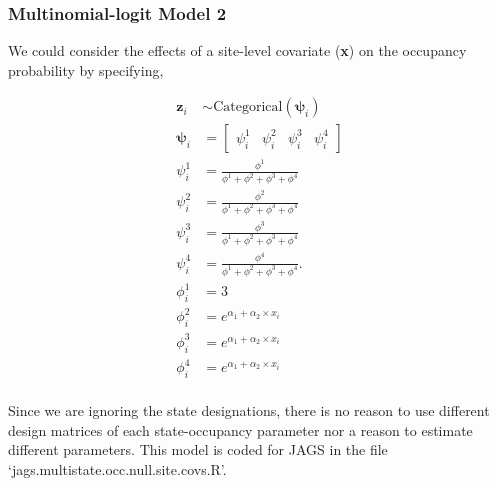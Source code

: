 \documentclass[12pt]{article}
\begin{document}
\subsubsection{Multinomial-logit Model 2}
We could consider the effects of a site-level covariate (\textbf{x}) on the occupancy probability by specifying,
\begin{center}
\begin{align*}
\textbf{z}_{i} &\sim \text{Categorical}(\boldsymbol{\psi}_{i})\\
\boldsymbol{\psi}_{i} &= \begin{bmatrix} \psi^1_{i} & \psi^2_{i} & \psi^3_{i} & \psi^4_{i} \end{bmatrix}\\
\psi^1_{i} &=\frac{\phi^1}{\phi^1+ \phi^2+\phi^3+\phi^4}\\
\psi^2_{i} &=\frac{\phi^2}{\phi^1+ \phi^2+\phi^3+\phi^4}\\
\psi^3_{i} &=\frac{\phi^3}{\phi^1+ \phi^2+\phi^3+\phi^4}\\
\psi^4_{i} &=\frac{\phi^4}{\phi^1+ \phi^2+\phi^3+\phi^4}.\\
\phi^1_{i} &= 3\\
\phi^2_{i} &= e^{\alpha_{1}+\alpha_{2}\times x_{i}}\\
\phi^3_{i} &= e^{\alpha_{1}+\alpha_{2}\times x_{i}}\\
\phi^4_{i} &= e^{\alpha_{1}+\alpha_{2}\times x_{i}}\\
\end{align*}
\end{center}
Since we are ignoring the state designations, there is no reason to use different design matrices of each state-occupancy parameter nor a reason to estimate different parameters. This model is coded for JAGS in the file `jags.multistate.occ.null.site.covs.R'.
\end{document}

